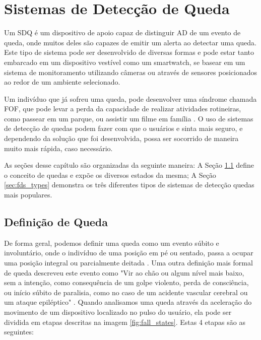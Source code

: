 \chapter{Sistemas de Detecção de Queda}
\label{cap:sistemasRecomendacao}

Um \ac{SDQ} é um dispositivo de apoio capaz de distinguir \ac{AD}  de um evento de queda, onde muitos deles são capazes de emitir um alerta ao detectar uma queda. Este tipo de sistema pode ser desenvolvido de diversas formas e pode estar tanto embarcado em um dispositivo vestível como um smartwatch, se basear em um sistema de monitoramento utilizando câmeras ou através de sensores posicionados ao redor de um ambiente selecionado. 


Um indivíduo que já sofreu uma queda, pode desenvolver uma síndrome chamada \ac{FOF}, que pode levar a perda da capacidade de realizar atividades rotineiras, como passear em um parque, ou assistir um filme em família \citep{legters2002fear}. O uso de sistemas de detecção de quedas podem fazer com que o usuários e sinta mais seguro, e dependendo da solução que foi desenvolvida, possa ser socorrido de maneira muito mais rápida, caso necessário. 


As seções desse capítulo são organizadas da seguinte maneira: A Seção \ref{sec:fall_definition} define o conceito de quedas e expõe os diversos estados da mesma; A Seção \ref{sec:fds_types} demonstra os três diferentes tipos de sistemas de detecção quedas mais populares.



\section{Definição de Queda}
\label{sec:fall_definition}
De forma geral, podemos definir uma queda como um evento súbito e involuntário, onde o indivíduo de uma posição em pé ou sentado, passa a ocupar uma posição integral ou parcialmente deitada  \citep{igual2013challenges}. Uma outra definição mais formal de queda descreveu este evento como "Vir ao chão ou algum nível mais baixo, sem a intenção, como consequência de um golpe violento, perda de consciência, ou início súbito de paralisia, como no caso de um acidente vascular cerebral ou um ataque epiléptico" \citep{gibson1987prevention}. Quando analisamos uma queda através da aceleração do movimento de um dispositivo localizado no pulso do usuário, ela pode ser dividida em etapas descritas na imagem \ref{fig:fall_states}. Estas 4 etapas são as seguintes:


